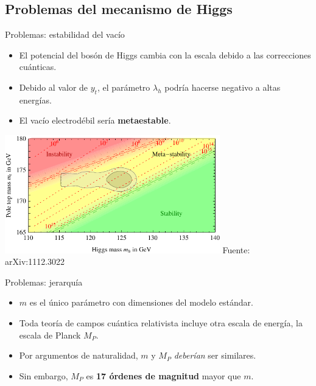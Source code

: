 \documentclass{beamer}
\begin{document}
\subsection{Problemas del mecanismo de Higgs}
\begin{frame}[t]{Problemas: estabilidad del vacío}
\begin{itemize}
\item El potencial del bosón de Higgs cambia con la escala debido a las correcciones cuánticas.
\item Debido al valor de $y_t$, el parámetro $\lambda_h$ podría hacerse negativo a altas energías.
\item El vacío electrodébil sería \textbf{metaestable}.
\end{itemize}
\begin{center}
\includegraphics[width=0.7\textwidth]{stability}
{\scriptsize Fuente: arXiv:1112.3022}
\end{center}

\end{frame}

\begin{frame}{Problemas: jerarquía}
\begin{itemize}
\item $m$ es el único parámetro con dimensiones del modelo estándar.
\item Toda teoría de campos cuántica relativista incluye otra escala de energía, la escala de Planck $M_P$.
\item Por argumentos de naturalidad, $m$ y $M_P$ \textit{deberían} ser similares.
\item Sin embargo, $M_P$ es \textbf{17 órdenes de magnitud} mayor que $m$.  
\end{itemize}
\end{frame}
\end{document}
